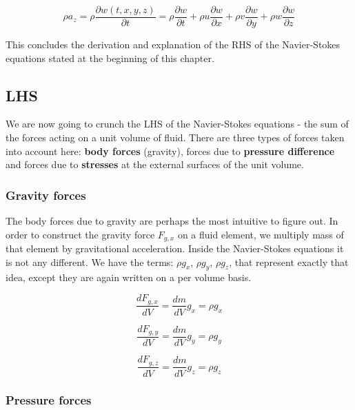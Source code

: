 \begin{equation}
\rho a_z = \rho \frac{\partial w(t,x,y,z)}{\partial t} = \rho \frac{\partial w}{\partial t} + \rho u \frac{\partial w}{\partial x} + \rho v \frac{\partial w}{\partial y} + \rho w \frac{\partial w}{\partial z}
\end{equation}

This concludes the derivation and explanation of the RHS of the Navier-Stokes equations stated at the beginning of this chapter.


\subsection{LHS}

We are now going to crunch the LHS of the Navier-Stokes equations - the sum of the forces acting on a unit volume of fluid. There are three types of forces taken into account here: \textbf{body forces} (gravity), forces due to \textbf{pressure difference} and forces due to \textbf{stresses} at the external surfaces of the unit volume.

\subsubsection{Gravity forces}

The body forces due to gravity are perhaps the most intuitive to figure out. In order to construct the gravity force $F_{g, x}$ on a fluid element, we multiply mass of that element by gravitational acceleration. Inside the Navier-Stokes equations it is not any different. We have the terms: $\rho g_x$, $\rho g_y$, $\rho g_z$, that represent exactly that idea, except they are again written on a per volume basis.

\begin{equation}
\frac{d F_{g, x}}{dV} = \frac{dm}{dV} g_x =  \rho g_x
\end{equation}

\begin{equation}
\frac{d F_{g, y}}{dV} = \frac{dm}{dV} g_y =  \rho g_y
\end{equation}

\begin{equation}
\frac{d F_{g, z}}{dV} = \frac{dm}{dV} g_z =  \rho g_z
\end{equation}


\subsubsection{Pressure forces}


